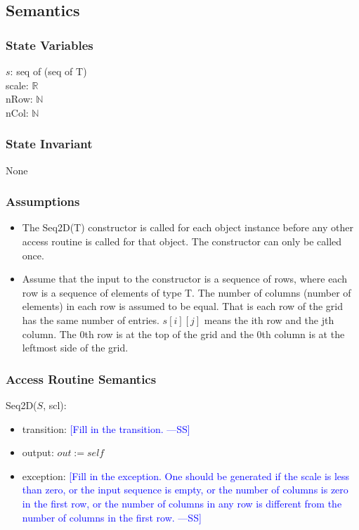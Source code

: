 \documentclass[12pt]{article}
\newcommand{\authornote}[3]{\textcolor{#1}{[#3 ---#2]}}
\newcommand{\authornote}[3]{}
\newcommand{\wss}[1]{\authornote{blue}{SS}{#1}}
\begin{document}
\subsection* {Semantics}

\subsubsection* {State Variables}

$s$: seq of (seq of T)\\
scale: $\mathbb{R}$\\
nRow: $\mathbb{N}$\\
nCol: $\mathbb{N}$

\subsubsection* {State Invariant}

None

\subsubsection* {Assumptions}

\begin{itemize}
\item The Seq2D(T) constructor is called for each object instance before any
other access routine is called for that object.  The constructor can only be
called once.
\item Assume that the input to the constructor is a sequence of rows, where each
  row is a sequence of elements of type T.  The number of columns (number of
  elements) in each row is assumed to be equal. That is each row
  of the grid has the same number of entries.  $s[i][j]$ means the ith row and
  the jth column.  The 0th row is at the top of the grid and the 0th column
  is at the leftmost side of the grid.
\end{itemize}

\subsubsection* {Access Routine Semantics}

Seq2D($S$, scl):
\begin{itemize}
\item transition: \wss{Fill in the transition.}
\item output: $\mathit{out} := \mathit{self}$
\item exception: \wss{Fill in the exception.  One should be generated if the
    scale is less than zero, or the input sequence is empty, or the number of
    columns is zero in the first row, or the number of columns in any row is
    different from the number of columns in the first row.}
\end{itemize}
\end{document}
